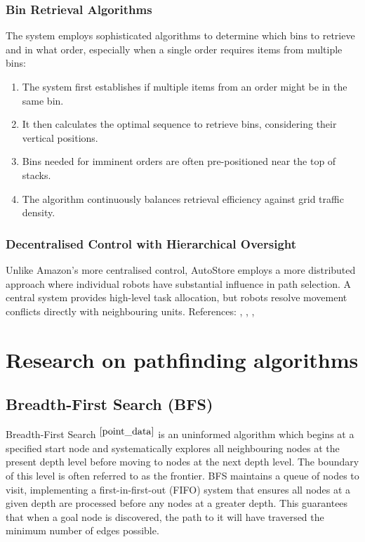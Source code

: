 \subsubsection{Bin Retrieval Algorithms}
The system employs sophisticated algorithms to determine which bins to retrieve and in what order, especially when a single order requires items from multiple bins:
\begin{enumerate}
    \item The system first establishes if multiple items from an order might be in the same bin.
    \item It then calculates the optimal sequence to retrieve bins, considering their vertical positions.
    \item Bins needed for imminent orders are often pre-positioned near the top of stacks.
    \item The algorithm continuously balances retrieval efficiency against grid traffic density.
\end{enumerate}

\subsubsection{Decentralised Control with Hierarchical Oversight}
Unlike Amazon's more centralised control, AutoStore employs a more distributed approach where individual robots have substantial influence in path selection. A central system provides high-level task allocation, but robots resolve movement conflicts directly with neighbouring units. References: \cite{autostore_2023_autostore}, \cite{solutions_2025_autostore}, \cite{systems_2018_autostore}, \cite{systems_autostore}

\newpage

\section{Research on pathfinding algorithms}

\subsection{Breadth-First Search (BFS)}
Breadth-First Search $^{\cite{point_data}}$ is an uninformed algorithm which begins at a specified start node and systematically explores all neighbouring nodes at the present depth level before moving to nodes at the next depth level. The boundary of this level is often referred to as the frontier. BFS maintains a queue of nodes to visit, implementing a first-in-first-out (FIFO) system that ensures all nodes at a given depth are processed before any nodes at a greater depth. This guarantees that when a goal node is discovered, the path to it will have traversed the minimum number of edges possible.
